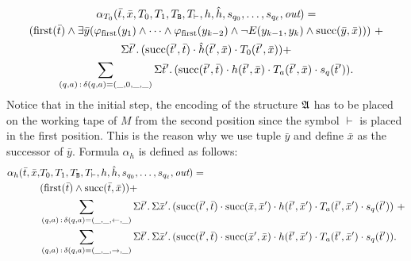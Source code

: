 \begin{multline*}
\alpha_{T_0}(\bar{t},\bar{x},T_0,T_1,T_{\mathtt{B}},T_{\vdash},h,\hat{h},s_{q_0},\ldots,s_{q_{\ell}},\text{\it out}) = \\ 
(\operatorname{first}(\bar{t}) \wedge \exists\bar{y}(\varphi_{\text{\rm first}}(y_1) \wedge \cdots \wedge \varphi_{\text{\rm first}}(y_{k-2}) \wedge\neg E(y_{k-1},y_k) \wedge \text{succ}(\bar{y},\bar{x}) ))\ + \\
\Sigma{\bar{t}'}.\,(\text{succ}(\bar{t}',\bar{t}) \cdot \hat{h}(\bar{t}',\bar{x}) \cdot T_0(\bar{t}',\bar{x})) + \\
\sum_{(q,a) \,:\, \delta(q,a) = (\_,0,\_,\_)}\Sigma{\bar{t}'}.\,(\text{succ}(\bar{t}',\bar{t}) \cdot h(\bar{t}',\bar{x}) \cdot T_a(\bar{t}',\bar{x}) \cdot s_{q}(\bar{t}')).
\end{multline*}
Notice that in the initial step, the encoding of the structure $\mathfrak{A}$ has to be placed on the working tape of $M$ from the second position since the symbol $\vdash$ is placed in the first position. This is the reason why we use tuple $\bar y$ and define $\bar x$ as the successor of $\bar y$.
Formula $\alpha_{h}$ is defined as follows:
\begin{align*}
\alpha_{h}(\bar{t},\bar{x},&T_0,T_1,T_{\mathtt{B}},T_{\vdash},h,\hat{h},s_{q_0},\ldots,s_{q_{\ell}},\text{\it out}) = \\
&(\operatorname{first}(\bar{t}) \wedge \text{succ}(\bar{t},\bar{x})) + \\
&\sum_{(q,a) \,:\, \delta(q,a) = (\_,\_,\leftarrow,\_)}\Sigma{\bar{t}'}.\,\Sigma{\bar{x}'}.\,(\text{succ}(\bar{t}',\bar{t}) \cdot \text{succ}(\bar{x},\bar{x}')\cdot h(\bar{t}',\bar{x}') \cdot T_a(\bar{t}',\bar{x}') \cdot s_{q}(\bar{t}')) \ + \\
&\sum_{(q,a) \,:\, \delta(q,a) = (\_,\_,\rightarrow,\_)}\Sigma{\bar{t}'}.\,\Sigma{\bar{x}'}.\,(\text{succ}(\bar{t}',\bar{t}) \cdot \text{succ}(\bar{x}',\bar{x})\cdot h(\bar{t}',\bar{x}') \cdot T_a(\bar{t}',\bar{x}') \cdot s_{q}(\bar{t}')).
\end{align*}
